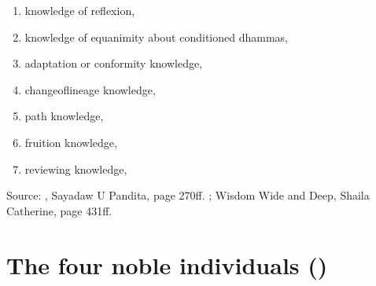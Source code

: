 \documentclass[letterpaper,10pt,english]{sphinxmanual}
\begin{document}
\begin{enumerate}
\item {} 
\sphinxAtStartPar
knowledge of reflexion, 

\item {} 
\sphinxAtStartPar
knowledge of equanimity about conditioned dhammas, 

\item {} 
\sphinxAtStartPar
adaptation or conformity knowledge, 

\item {} 
\sphinxAtStartPar
change\sphinxhyphen{}of\sphinxhyphen{}lineage knowledge, 

\item {} 
\sphinxAtStartPar
path knowledge, 

\item {} 
\sphinxAtStartPar
fruition knowledge, 

\item {} 
\sphinxAtStartPar
reviewing knowledge, 

\end{enumerate}

\sphinxAtStartPar
Source: , Sayadaw U Pandita, page 270ff. ; Wisdom Wide and Deep, Shaila Catherine, page 431ff.


\section{The four noble individuals ()}
\label{\detokenize{appendices:the-four-noble-individuals-ariya-puggala}}
\end{document}

